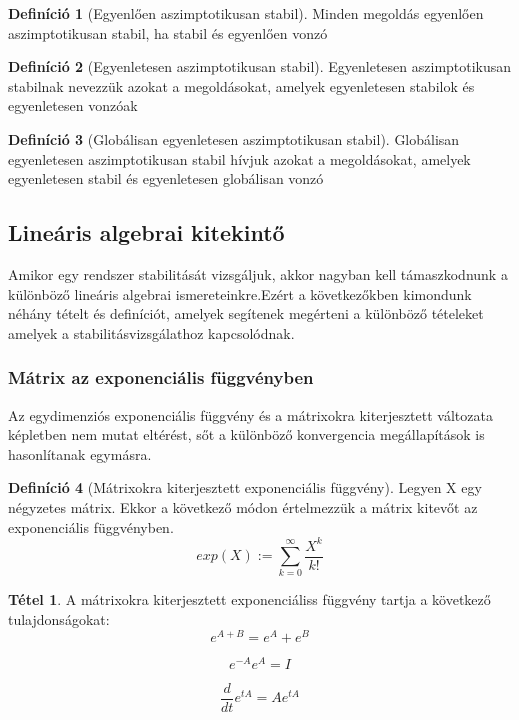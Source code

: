 \documentclass{article}
\theoremstyle{definition}
\theoremstyle{theorem}
\newtheorem{definition}{Definíció}
\newtheorem{theorem}{Tétel}
\begin{document}
\begin{definition}[Egyenlően aszimptotikusan stabil]
Minden megoldás egyenlően aszimptotikusan stabil, ha stabil és egyenlően vonzó
\end{definition}

\begin{definition}[Egyenletesen aszimptotikusan stabil]
Egyenletesen aszimptotikusan stabilnak nevezzük azokat a megoldásokat, amelyek egyenletesen stabilok és egyenletesen vonzóak
\end{definition}

\begin{definition}[Globálisan egyenletesen aszimptotikusan stabil]
Globálisan egyenletesen aszimptotikusan stabil hívjuk azokat a megoldásokat, amelyek egyenletesen stabil és egyenletesen globálisan vonzó
\end{definition}
\subsection{Lineáris algebrai kitekintő}
Amikor egy rendszer stabilitását vizsgáljuk, akkor nagyban kell támaszkodnunk a különböző lineáris algebrai ismereteinkre.Ezért a következőkben kimondunk néhány tételt és definíciót, amelyek segítenek megérteni a különböző tételeket amelyek a stabilitásvizsgálathoz kapcsolódnak.

\subsubsection{Mátrix az exponenciális függvényben}
Az egydimenziós exponenciális függvény és a mátrixokra kiterjesztett változata képletben nem mutat eltérést, sőt a különböző konvergencia megállapítások is hasonlítanak egymásra.
\begin{definition}[Mátrixokra kiterjesztett exponenciális függvény]
Legyen X egy négyzetes mátrix. Ekkor a következő módon értelmezzük a mátrix kitevőt az exponenciális függvényben.
\begin{equation*}
    exp(X) := \sum_{k=0}^{\infty} \frac{X^k}{k!}
\end{equation*}
\end{definition}
\begin{theorem}
A mátrixokra kiterjesztett exponenciáliss függvény tartja a következő tulajdonságokat:
        \begin{equation*}
            e^{A+B} = e^A + e^B
        \end{equation*}

        \begin{equation*}
            e^{-A} e^{A} = I
        \end{equation*}

        \begin{equation*}
            \frac{d}{dt} e^{tA} = A e^{tA}
        \end{equation*}
\end{theorem}
\end{document}
